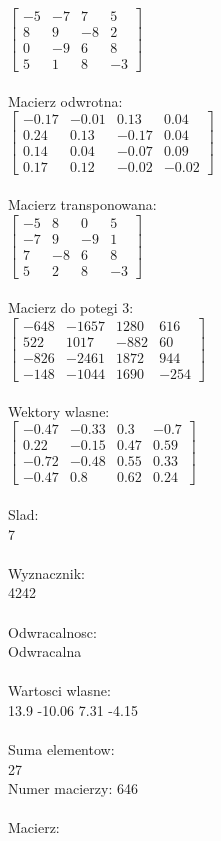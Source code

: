 \documentclass[a4paper,12pt]{article}
\begin{document}
$\begin{bmatrix} -5&-7&7&5\\8&9&-8&2\\0&-9&6&8\\5&1&8&-3 \end{bmatrix}$
\\
\\
Macierz odwrotna:\\

$\begin{bmatrix} -0.17&-0.01&0.13&0.04\\0.24&0.13&-0.17&0.04\\0.14&0.04&-0.07&0.09\\0.17&0.12&-0.02&-0.02 \end{bmatrix}$
\\
\\
Macierz transponowana:\\

$\begin{bmatrix} -5&8&0&5\\-7&9&-9&1\\7&-8&6&8\\5&2&8&-3 \end{bmatrix}$
\\
\\
Macierz do potegi 3:\\

$\begin{bmatrix} -648&-1657&1280&616\\522&1017&-882&60\\-826&-2461&1872&944\\-148&-1044&1690&-254 \end{bmatrix}$
\\
\\
Wektory wlasne:\\

$\begin{bmatrix} -0.47&-0.33&0.3&-0.7\\0.22&-0.15&0.47&0.59\\-0.72&-0.48&0.55&0.33\\-0.47&0.8&0.62&0.24 \end{bmatrix}$
\\
\\
Slad:\\
7
\\
\\
Wyznacznik:\\
4242
\\
\\
Odwracalnosc:\\
Odwracalna
\\
\\
Wartosci wlasne:\\
13.9 -10.06 7.31 -4.15
\\
\\
Suma elementow:\\
27
\\
\newpage
Numer macierzy:
646
\\
\\
Macierz:\\
\end{document}
